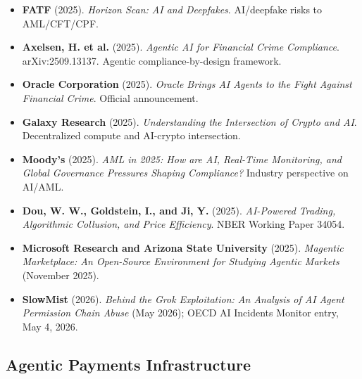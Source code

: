 \documentclass[11pt,letterpaper]{article}
\begin{document}
\begin{itemize}[leftmargin=1.5em]
  \item \textbf{FATF} (2025). \textit{Horizon Scan: AI and Deepfakes}. AI/deepfake risks to AML/CFT/CPF.
  \item \textbf{Axelsen, H. et al.} (2025). \textit{Agentic AI for Financial Crime Compliance}. arXiv:2509.13137. Agentic compliance-by-design framework.
  \item \textbf{Oracle Corporation} (2025). \textit{Oracle Brings AI Agents to the Fight Against Financial Crime}. Official announcement.
  \item \textbf{Galaxy Research} (2025). \textit{Understanding the Intersection of Crypto and AI}. Decentralized compute and AI-crypto intersection.
  \item \textbf{Moody's} (2025). \textit{AML in 2025: How are AI, Real-Time Monitoring, and Global Governance Pressures Shaping Compliance?} Industry perspective on AI/AML.
  \item \textbf{Dou, W. W., Goldstein, I., and Ji, Y.} (2025). \textit{AI-Powered Trading, Algorithmic Collusion, and Price Efficiency}. NBER Working Paper 34054.
  \item \textbf{Microsoft Research and Arizona State University} (2025). \textit{Magentic Marketplace: An Open-Source Environment for Studying Agentic Markets} (November 2025).
  \item \textbf{SlowMist} (2026). \textit{Behind the Grok Exploitation: An Analysis of AI Agent Permission Chain Abuse} (May 2026); OECD AI Incidents Monitor entry, May 4, 2026.
\end{itemize}

\subsection*{Agentic Payments Infrastructure}
\end{document}
